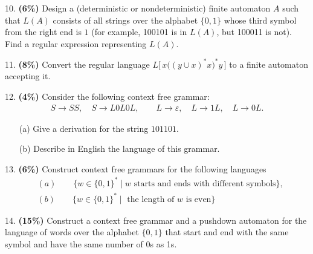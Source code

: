 \documentclass[11pt]{article}
\begin{document}
\begin{itemize}
    \item[] {
  }
\end{itemize}


\medskip
\noindent
%
10. {\bf (6\%)} Design a (deterministic or nondeterministic) finite automaton $A$ such that $L(A)$ consists of all strings over the alphabet $\{0,1\}$ whose third symbol from the right end is $1$ (for example, 100101 is in $L(A)$, but 100011 is not). 
Find a regular expression representing $L(A)$. 



\medskip
\noindent
%
11. {\bf (8\%)} Convert the regular language 
$L\bigl[\,x\bigl((y\cup x)^\ast x\bigr)^\ast y\,\bigr]$
to a finite automaton accepting it.





\medskip
\noindent
%
12. {\bf (4\%)} Consider the following context free grammar:
%
\begin{align*}
S \to SS, \quad S \to L0L0L, \qquad  L \to \varepsilon, \quad L \to 1 L, \quad L \to 0L.
\end{align*}

%
\begin{enumerate}
\item[(a)] Give a derivation for the string $101101$.

\item[(b)] Describe in English the language of this grammar.
\end{enumerate}



\medskip
\noindent
%
13. {\bf (6\%)} Construct context free grammars for the following languages
%
\begin{align*}
& (a) \qquad \{ w \in \{0,1\}^* \mid w \text{ starts and ends with different symbols}\},\\
& (b) \qquad  \{ w \in \{0,1\}^* \mid \text{ the length of $w$ is even}\}
\end{align*}





\medskip
\noindent
%
14. {\bf (15\%)} Construct a context free grammar and a pushdown automaton for the  language of words over the alphabet $\{0,1\}$ that start and end with the same symbol and have the same number of 0s as 1s.
\end{document}
